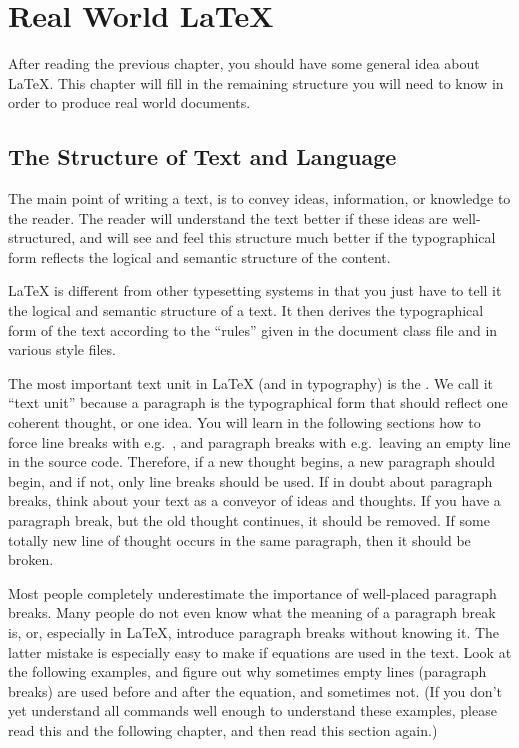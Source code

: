 \chapter{Real World \LaTeX{}}

\begin{intro}
  After reading the previous chapter, you should have some general idea
about \LaTeX{}. This chapter
  will fill in the remaining structure you will need to know in order
  to produce real world documents.
\end{intro}

\section{The Structure of Text and Language}
The main point of writing a text, is to convey ideas, information, or
knowledge to the reader.  The reader will understand the text better
if these ideas are well-structured, and will see and feel this
structure much better if the typographical form reflects the logical
and semantic structure of the content.

\LaTeX{} is different from other typesetting systems in that you just
have to tell it the logical and semantic structure of a text.  It
then derives the typographical form of the text according to the
``rules'' given in the document class file and in various style files.

The most important text unit in \LaTeX{} (and in typography) is the
.  We call it ``text unit'' because a paragraph is the
typographical form that should reflect one coherent thought, or one idea.
You will learn in the following sections how to force line breaks with
e.g.\ \texttt{\bs\bs}, and paragraph breaks with e.g.\ leaving an empty line
in the source code.  Therefore, if a new thought begins, a new paragraph
should begin, and if not, only line breaks should be used.  If in doubt
about paragraph breaks, think about your text as a conveyor of ideas and
thoughts.  If you have a paragraph break, but the old thought continues, it
should be removed.  If some totally new line of thought occurs in the same
paragraph, then it should be broken.

Most people completely underestimate the importance of well-placed
paragraph breaks.  Many people do not even know what the meaning of
a paragraph break is, or, especially in \LaTeX, introduce paragraph
breaks without knowing it.  The latter mistake is especially easy to
make if equations are used in the text.  Look at the following
examples, and figure out why sometimes empty lines (paragraph breaks)
are used before and after the equation, and sometimes not.  (If you
don't yet understand all commands well enough to understand these
examples, please read this and the following chapter, and then read
this section again.)

